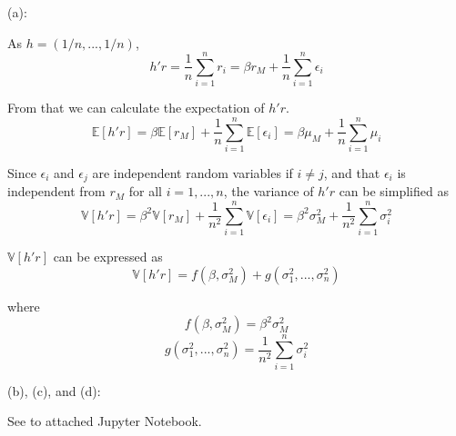 \documentclass[a4paper]{article}
\begin{document}
(a):\newline

As $h=(1/n,...,1/n)$,
\[h'r=\frac{1}{n}\sum_{i=1}^n {r_i}=\beta r_M+\frac{1}{n}\sum_{i=1}^n {\epsilon_i}\]

From that we can calculate the expectation of $h'r$.
\[\mathbb{E}[h'r]=\beta\mathbb{E}[r_M]+\frac{1}{n}\sum_{i=1}^n {\mathbb{E}[\epsilon_i]}=\beta\mu_M+\frac{1}{n}\sum_{i=1}^n {\mu_i}\]

Since $\epsilon_i$ and $\epsilon_j$ are independent random variables if $i\neq j$, and that $\epsilon_i$ is independent from $r_M$ for all $i=1,...,n$, the variance of $h'r$ can be simplified as
\[\mathbb{V}[h'r]=\beta^2\mathbb{V}[r_M]+\frac{1}{n^2}\sum_{i=1}^n {\mathbb{V}[\epsilon_i]}=\beta^2\sigma_M^2+\frac{1}{n^2}\sum_{i=1}^n {\sigma_i^2}\]

$\mathbb{V}[h'r]$ can be expressed as
\[\mathbb{V}[h'r]=f(\beta,\sigma_M^2)+g(\sigma_1^2,...,\sigma_n^2)\]

where
\[f(\beta,\sigma_M^2)=\beta^2\sigma_M^2\]
\[g(\sigma_1^2,...,\sigma_n^2)=\frac{1}{n^2}\sum_{i=1}^n {\sigma_i^2}\]

(b), (c), and (d):\newline

See to attached Jupyter Notebook.\newline
\end{document}
